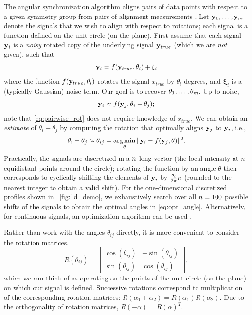 The angular synchronization algorithm aligns pairs of data points with respect to a given symmetry group from pairs of alignment measurements \citep{singer2011angular}. 
%
Let $ \mathbf{y}_1, \dots, \mathbf{y}_m$ denote the signals that we wish to align with respect to rotations;
each signal is a function defined on the unit circle (on the plane).
%
First assume that each signal $\mathbf{y}_i$ is a {\it noisy} rotated copy of the underlying signal $\mathbf{y}_{true}$
(which we are {\it not} given), such that
\begin{equation}
\mathbf{y}_i = f(\mathbf{y}_{true}, \theta_i) + \mathbf{\xi}_i
\end{equation}
where the function $f(\mathbf{y}_{true}, \theta_i)$ rotates the signal $x_{true}$ by $\theta_i$ degrees, and $\mathbf{\xi}_i$ is a (typically Gaussian) noise term.
%
Our goal is to recover $\theta_1, \dots, \theta_m$.
%
Up to noise,
\begin{equation} \label{eq:pairwise_rot}
\mathbf{y}_i \approx f(\mathbf{y}_j, \theta_i - \theta_j) ;
\end{equation}
note that \eqref{eq:pairwise_rot} does not require knowledge of $x_{true}$.
%
We can obtain an {\it estimate} of $\theta_i - \theta_j$ by computing the rotation that optimally aligns $\mathbf{y}_j$ to $\mathbf{y}_i$,
i.e., %
%
\begin{equation} \label{eq:opt_angle}
\theta_i - \theta_j \approx \theta_{ij} = \operatorname*{arg\,min}_{\theta} \|\mathbf{y}_i - f(\mathbf{y}_j, \theta)\|^2.
\end{equation}
%
Practically, the signals are discretized in a $n$-long vector (the local intensity at $n$ equidistant points around the circle);
rotating the function by an angle $\theta$ then corresponds to cyclically shifting the elements of $\mathbf{y}_i$
by $\frac{\theta_i}{2 \pi} n$ (rounded to the nearest integer to obtain a valid shift).
%
For the one-dimensional discretized profiles shown in \fig~\ref{fig:1d_demo}, we exhaustively search over all $n=100$ possible shifts of the signals to obtain the optimal angles in \eqref{eq:opt_angle}.
%
Alternatively, for continuous signals, an optimization algorithm
can be used \citep{ahuja2007template}.

Rather than work with the angles $\theta_{ij}$ directly, it is more convenient to consider the rotation matrices,
\begin{equation} \label{eq:R_theta}
R(\theta_{ij}) = \begin{bmatrix}
\cos(\theta_{ij}) & -\sin(\theta_{ij}) \\
\sin(\theta_{ij}) & \cos(\theta_{ij})
\end{bmatrix},
\end{equation}
which we can think of as operating on the points of the unit circle (on the plane) on which our signal is defined.
%
Successive rotations correspond to multiplication of the corresponding rotation matrices: $R(\alpha_1 + \alpha_2) = R(\alpha_1) R(\alpha_2)$.
%
Due to the orthogonality of rotation matrices, $R(-\alpha) = R(\alpha)^T$.

